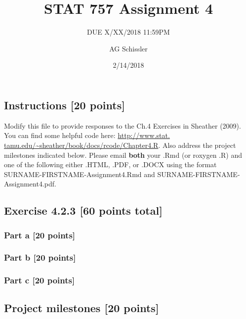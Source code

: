 \documentclass[]{article}
\title{STAT 757 Assignment 4}
\subtitle{DUE X/XX/2018 11:59PM}
\author{AG Schissler}
\date{2/14/2018}
\begin{document}
\maketitle

\hypertarget{instructions-20-points}{%
\subsection{Instructions {[}20 points{]}}\label{instructions-20-points}}

Modify this file to provide responses to the Ch.4 Exercises in Sheather
(2009). You can find some helpful code here:
\href{http://www.stat.tamu.edu/~sheather/book/docs/rcode/Chapter4.R}{http://www.stat.
tamu.edu/\textasciitilde{}sheather/book/docs/rcode/Chapter4.R}. Also
address the project milestones indicated below. Please email
\textbf{both} your .Rmd (or roxygen .R) and one of the following either
.HTML, .PDF, or .DOCX using the format SURNAME-FIRSTNAME-Assignment4.Rmd
and SURNAME-FIRSTNAME-Assignment4.pdf.

\hypertarget{exercise-4.2.3-60-points-total}{%
\subsection{Exercise 4.2.3 {[}60 points
total{]}}\label{exercise-4.2.3-60-points-total}}

\hypertarget{part-a-20-points}{%
\subsubsection{Part a {[}20 points{]}}\label{part-a-20-points}}

\hypertarget{part-b-20-points}{%
\subsubsection{Part b {[}20 points{]}}\label{part-b-20-points}}

\hypertarget{part-c-20-points}{%
\subsubsection{Part c {[}20 points{]}}\label{part-c-20-points}}

\hypertarget{project-milestones-20-points}{%
\subsection{Project milestones {[}20
points{]}}\label{project-milestones-20-points}}
\end{document}
